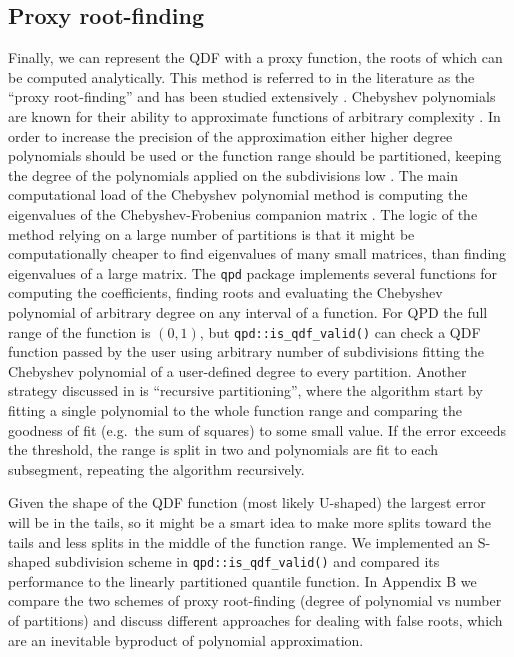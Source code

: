 \documentclass[
  12pt,
]{article}
\begin{document}
\hypertarget{proxy-root-finding}{%
\subsection{Proxy root-finding}\label{proxy-root-finding}}

Finally, we can represent the QDF with a proxy function, the roots of which can be computed analytically. This method is referred to in the literature as the ``proxy root-finding'' and has been studied extensively \citep{boyd2013FindingZerosUnivariate}. Chebyshev polynomials are known for their ability to approximate functions of arbitrary complexity \citep{boyd2007NumericalExperimentsAccuracy}. In order to increase the precision of the approximation either higher degree polynomials should be used or the function range should be partitioned, keeping the degree of the polynomials applied on the subdivisions low \citep{boyd2006ComputingRealRoots}. The main computational load of the Chebyshev polynomial method is computing the eigenvalues of the Chebyshev-Frobenius companion matrix \citep{boyd2013FindingZerosUnivariate}. The logic of the method relying on a large number of partitions is that it might be computationally cheaper to find eigenvalues of many small matrices, than finding eigenvalues of a large matrix. The \texttt{qpd} package \citep{perepolkin2019QpdToolsQuantileparameterized} implements several functions for computing the coefficients, finding roots and evaluating the Chebyshev polynomial of arbitrary degree on any interval of a function. For QPD the full range of the function is \((0,1)\), but \texttt{qpd::is\_qdf\_valid()} can check a QDF function passed by the user using arbitrary number of subdivisions fitting the Chebyshev polynomial of a user-defined degree to every partition. Another strategy discussed in \citet{boyd2013FindingZerosUnivariate} is ``recursive partitioning'', where the algorithm start by fitting a single polynomial to the whole function range and comparing the goodness of fit (e.g.~the sum of squares) to some small value. If the error exceeds the threshold, the range is split in two and polynomials are fit to each subsegment, repeating the algorithm recursively.

Given the shape of the QDF function (most likely U-shaped) the largest error will be in the tails, so it might be a smart idea to make more splits toward the tails and less splits in the middle of the function range. We implemented an S-shaped subdivision scheme in \texttt{qpd::is\_qdf\_valid()} and compared its performance to the linearly partitioned quantile function. In Appendix B we compare the two schemes of proxy root-finding (degree of polynomial vs number of partitions) and discuss different approaches for dealing with false roots, which are an inevitable byproduct of polynomial approximation.
\end{document}
